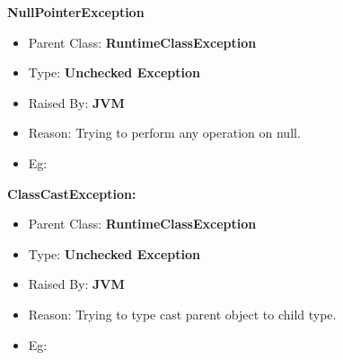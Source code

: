 \begin{flushleft}
\begin{itemize}
{		}
	\end{itemize}
	
	\textbf{NullPointerException}
	\begin{itemize}
		\item Parent Class: \textbf{RuntimeClassException}
		\item Type: \textbf{Unchecked Exception}
		\item Raised By: \textbf{JVM}
		\item Reason: Trying to perform any operation on null.
		\item Eg:
		\newpage
		\bigskip
	\end{itemize}

	\textbf{ClassCastException:}
	\begin{itemize}
		\item Parent Class: \textbf{RuntimeClassException}
		\item Type: \textbf{Unchecked Exception}
		\item Raised By: \textbf{JVM}
		\item Reason: Trying to type cast parent object to child type.
		\item Eg:
		\bigskip
\end{itemize}
\end{flushleft}
